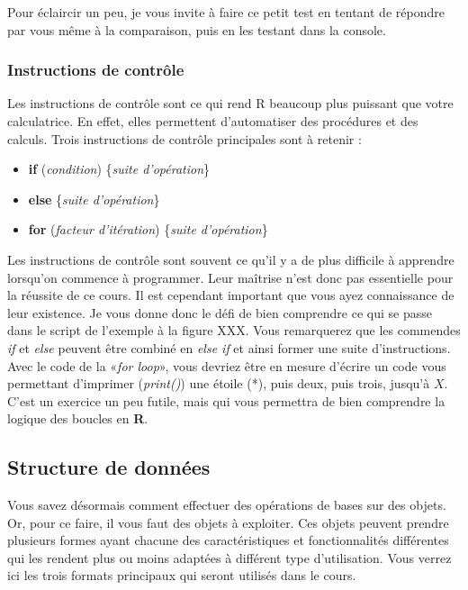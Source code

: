 \documentclass[10.5pt,a4paper]{article}
\begin{document}
    Pour éclaircir un peu, je vous invite à faire ce petit test en tentant de répondre par vous même à la comparaison, puis en les testant dans la console.
    

    
    \subsubsection{Instructions de contrôle}
    Les instructions de contrôle sont ce qui rend R beaucoup plus puissant que votre calculatrice. En effet, elles permettent d'automatiser des procédures et des calculs. Trois instructions de contrôle principales sont à retenir :
    
    \begin{itemize}
      \item \textbf{if} (\emph{condition}) \{\emph{suite d'opération}\}
      \item \textbf{else} \{\emph{suite d'opération}\}
      \item \textbf{for} (\emph{facteur d'itération}) \{\emph{suite d'opération}\}
    \end{itemize}
    
    Les instructions de contrôle sont souvent ce qu'il y a de plus difficile à apprendre lorsqu'on commence à programmer. Leur maîtrise n'est donc pas essentielle pour la réussite de ce cours. Il est cependant important que vous ayez connaissance de leur existence. Je vous donne donc le défi de bien comprendre ce qui se passe dans le script de l'exemple à la figure XXX. Vous remarquerez que les commendes \emph{if} et \emph{else} peuvent être combiné en \emph{else if} et ainsi former une suite d'instructions. Avec le code de la «\emph{for loop}», vous devriez être en mesure d'écrire un code vous permettant d'imprimer (\emph{print()}) une étoile (*), puis deux, puis trois, jusqu'à $X$. C'est un exercice un peu futile, mais qui vous permettra de bien comprendre la logique des boucles en \textbf{R}. 
  
  \subsection{Structure de données}
  Vous savez désormais comment effectuer des opérations de bases sur des objets. Or, pour ce faire, il vous faut des objets à exploiter. Ces objets peuvent prendre plusieurs formes ayant chacune des caractéristiques et fonctionnalités différentes qui les rendent plus ou moins adaptées à différent type d'utilisation. Vous verrez ici les trois formats principaux qui seront utilisés dans le cours. 
  
\end{document}
